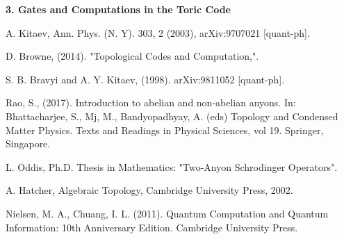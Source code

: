\documentclass[12pt]{report}
\begin{document}
	
	
	\begin{minipage}{1 \textwidth}
		
		
		\textbf{3. Gates and Computations in the Toric Code}\newline 
		
		
	\end{minipage}
	











 
	
	\begin{thebibliography}{99} %
		 A. Kitaev, Ann. Phys. (N. Y). 303, 2 (2003),
		arXiv:9707021 [quant-ph].
		
		
		
		 D. Browne, (2014). "Topological Codes and Computation,".
		
		 S. B. Bravyi and A. Y. Kitaev, (1998).
		arXiv:9811052 [quant-ph].
		
		  Rao, S., (2017). Introduction to abelian and non-abelian anyons. In: Bhattacharjee, S., Mj, M., Bandyopadhyay, A. (eds) Topology and Condensed Matter Physics. Texts and Readings in Physical Sciences, vol 19. Springer, Singapore. %
		
		
		 L. Oddis, Ph.D. Thesis in Mathematics: "Two-Anyon Schrodinger Operators".
		
		 A. Hatcher, Algebraic Topology, Cambridge University Press, 2002.
		
		 Nielsen, M. A., Chuang, I. L. (2011). Quantum Computation and Quantum Information: 10th Anniversary Edition. Cambridge University Press.
		

\end{thebibliography}
\end{document}
